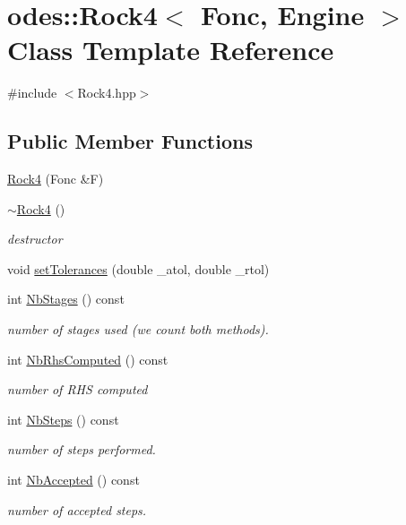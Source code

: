 \hypertarget{classodes_1_1Rock4}{\section{odes\-:\-:Rock4$<$ Fonc, Engine $>$ Class Template Reference}
\label{classodes_1_1Rock4}
}


{\ttfamily \#include $<$Rock4.\-hpp$>$}

\subsection*{Public Member Functions}
\begin{DoxyCompactItemize}
\item 
\hyperlink{classodes_1_1Rock4_aa2727a5ad6d43de35ed2e1d161b56d0d}{Rock4} (Fonc \&F)
\item 
\hyperlink{classodes_1_1Rock4_a51ca988666bec1652d648f13d3b02098}{$\sim$\-Rock4} ()
\begin{DoxyCompactList}\small\item\em destructor \end{DoxyCompactList}\item 
void \hyperlink{classodes_1_1Rock4_a88c0944586eeb41418517264b7e0bcf2}{set\-Tolerances} (double \-\_\-atol, double \-\_\-rtol)
\item 
int \hyperlink{classodes_1_1Rock4_a584af9026a3d887ec0ea516b500d5582}{Nb\-Stages} () const 
\begin{DoxyCompactList}\small\item\em number of stages used (we count both methods). \end{DoxyCompactList}\item 
int \hyperlink{classodes_1_1Rock4_ad9c4514131020c976736b4fde5c4ce78}{Nb\-Rhs\-Computed} () const 
\begin{DoxyCompactList}\small\item\em number of R\-H\-S computed \end{DoxyCompactList}\item 
int \hyperlink{classodes_1_1Rock4_aef95db2a0cb17d250b9359ff0c61ff0d}{Nb\-Steps} () const 
\begin{DoxyCompactList}\small\item\em number of steps performed. \end{DoxyCompactList}\item 
int \hyperlink{classodes_1_1Rock4_a1c757f7b33a0d5f50ff81faa54a1fe1b}{Nb\-Accepted} () const 
\begin{DoxyCompactList}\small\item\em number of accepted steps. \end{DoxyCompactList}\item 

\end{DoxyCompactItemize}
